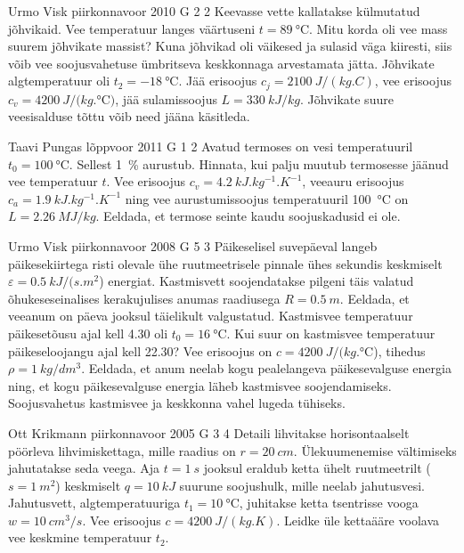\documentclass[11pt, twoside]{article}
\begin{document}
{%
{Urmo Visk} %
{piirkonnavoor} %
{2010} %
{G 2} %
{2} %
{
\ifStatement
Keevasse vette kallatakse külmutatud jõhvikaid. Vee temperatuur langes väärtuseni $t=\SI{89}{\celsius}$.
Mitu korda oli vee mass suurem jõhvikate massist? Kuna jõhvikad oli väikesed ja sulasid väga kiiresti, siis
võib vee soojusvahetuse ümbritseva keskkonnaga arvestamata jätta. Jõhvikate algtemperatuur oli
$t_2=\SI{-18}{\celsius}$. Jää erisoojus $c_j=\SI{2100}{J/(kg.C)}$, vee erisoojus $c_v=\SI{4200}{J/(kg.\celsius)}$, jää sulamissoojus $L=\SI{330}{kJ/kg}$. Jõhvikate suure veesisalduse tõttu võib need jääna käsitleda.
\fi
}

{Taavi Pungas} %
{lõppvoor} %
{2011} %
{G 1} %
{2} %
{
\ifStatement
Avatud termoses on vesi temperatuuril $t_0 = \SI{100}{\celsius}$. Sellest \SI{1}{\%}
aurustub. Hinnata, kui palju muutub termosesse jäänud vee temperatuur $t$.
Vee erisoojus $c_v = \SI{4,2}{kJ.kg^{-1}.K^{-1}}$, veeauru erisoojus $c_a = \SI{1,9}{kJ.kg^{-1}.K^{-1}}$ ning
vee aurustumissoojus temperatuuril \SI{100}{\celsius} on $L = \SI{2,26}{MJ/kg}$. Eeldada, et termose seinte kaudu soojuskadusid ei ole.
\fi
}

{Urmo Visk} %
{piirkonnavoor} %
{2008} %
{G 5} %
{3} %
{
\ifStatement
Päikeselisel suvepäeval langeb päikesekiirtega risti olevale ühe ruutmeetrisele pinnale ühes sekundis keskmiselt $\varepsilon = \SI{0,5}{kJ/(s.m^2}$) energiat. Kastmisvett soojendatakse pilgeni täis valatud õhukeseseinalises kerakujulises anumas raadiusega $R = \SI{0,5}{m}$. Eeldada, et veeanum on päeva jooksul täielikult valgustatud. Kastmisvee temperatuur päikesetõusu ajal kell 4.30 oli $t_0 = \SI{16}{\celsius}$. Kui suur on kastmisvee temperatuur päikeseloojangu ajal kell 22.30? Vee erisoojus on $c = \SI{4200}{J/(kg.\celsius}$), tihedus $\rho = \SI{1}{kg/dm^3}$. Eeldada, et anum neelab kogu pealelangeva päikesevalguse energia ning, et kogu päikesevalguse energia läheb kastmisvee soojendamiseks. Soojusvahetus kastmisvee ja keskkonna vahel lugeda tühiseks.
\fi
}

{Ott Krikmann} %
{piirkonnavoor} %
{2005} %
{G 3} %
{4} %
{
\ifStatement
Detaili lihvitakse horisontaalselt pöörleva lihvimiskettaga, mille raadius on $r = \SI{20}{cm}$. Ülekuumenemise vältimiseks jahutatakse seda veega. Aja $t = \SI{1}{s}$ jooksul eraldub ketta ühelt ruutmeetrilt ($s = \SI{1}{m^2}$) keskmiselt $q = \SI{10}{kJ}$ suurune soojushulk, mille neelab jahutusvesi. Jahutusvett, algtemperatuuriga $t_1 = \SI{10}{\celsius}$, juhitakse ketta tsentrisse vooga $w = \SI{10}{cm^3/s}$. Vee erisoojus $c = \SI{4200}{J/(kg.K)}$. Leidke üle kettaääre voolava vee keskmine temperatuur $t_2$.
\fi
}

}
\end{document}
